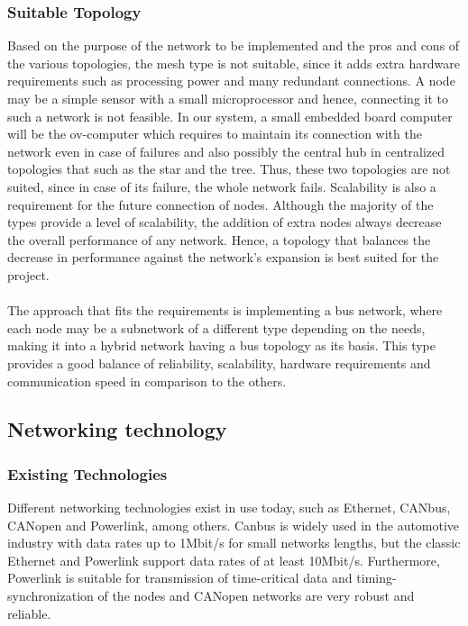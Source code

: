\subsubsection{Suitable Topology}
Based on the purpose of the network to be implemented and the pros and cons of the various topologies, the mesh type is not suitable, since it adds extra hardware requirements such as processing power and many redundant connections. A node may be a simple sensor with a small microprocessor and hence, connecting it to such a network is not feasible. In our system, a small embedded board computer will be the ov-computer which requires to maintain its connection with the network even in case of failures and also possibly the central hub in centralized topologies that such as the star and the tree. Thus, these two topologies are not suited, since in case of its failure, the whole network fails. Scalability is also a requirement for the future connection of nodes. Although the majority of the types provide a level of scalability, the addition of extra nodes always decrease the overall performance of any network. Hence, a topology that balances the decrease in performance against the network's expansion is best suited for the project.\\\\
The approach that fits the requirements is implementing a bus network, where each node may be a subnetwork of a different type depending on the needs, making it into a hybrid network having a bus topology as its basis. This type provides a good balance of reliability, scalability, hardware requirements and communication speed in comparison to the others.

\subsection{Networking technology}

\subsubsection{Existing Technologies}
Different networking technologies exist in use today, such as Ethernet, CANbus, CANopen and Powerlink, among others. Canbus is widely used in the automotive industry with data rates up to 1Mbit/s for small networks lengths, but the classic Ethernet and Powerlink support data rates of at least 10Mbit/s. Furthermore, Powerlink is suitable for transmission of time-critical data and timing-synchronization of the nodes and CANopen networks are very robust and reliable.
